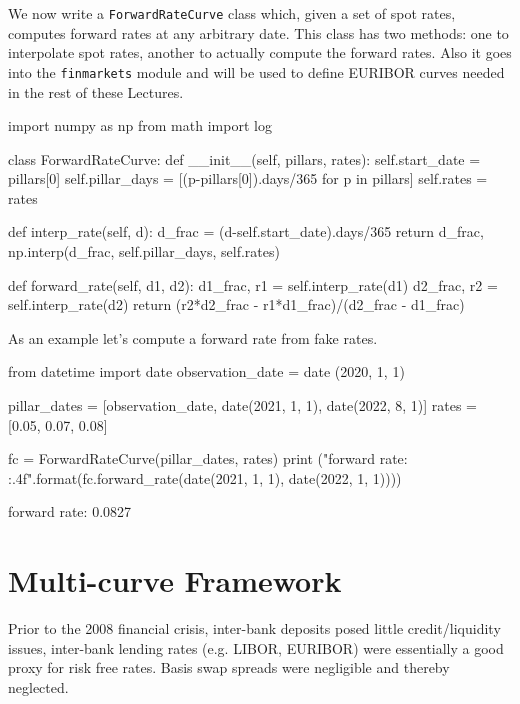 \begin{finmarkets}
We now write a \texttt{ForwardRateCurve} class which, given a set of spot rates, computes forward rates at any arbitrary date. This class has two methods: one to interpolate spot rates, another to actually compute the forward rates. Also it goes into the \texttt{finmarkets} module and will be used to define EURIBOR curves needed in the rest of these Lectures.
\end{finmarkets}

\begin{ipython}
import numpy as np
from math import log

class ForwardRateCurve:
    def __init__(self, pillars, rates):
        self.start_date = pillars[0]
        self.pillar_days = [(p-pillars[0]).days/365 for p in pillars]
        self.rates = rates

    def interp_rate(self, d):
        d_frac = (d-self.start_date).days/365
        return d_frac, np.interp(d_frac, self.pillar_days, self.rates)

    def forward_rate(self, d1, d2):
        d1_frac, r1 = self.interp_rate(d1)
        d2_frac, r2 = self.interp_rate(d2)
        return (r2*d2_frac - r1*d1_frac)/(d2_frac - d1_frac)
\end{ipython}

As an example let's compute a forward rate from fake rates.
\begin{ipython}
from datetime import date
observation_date = date (2020, 1, 1)

pillar_dates = [observation_date, 
                date(2021, 1, 1), 
                date(2022, 8, 1)]
rates = [0.05, 0.07, 0.08]

fc = ForwardRateCurve(pillar_dates, rates)
print ("forward rate: {:.4f}".format(fc.forward_rate(date(2021, 1, 1), 
                                                     date(2022, 1, 1))))
\end{ipython}
\begin{solution}
forward rate: 0.0827
\end{solution}

\section{Multi-curve Framework}
\label{sec:financial-crisis}

Prior to the 2008 financial crisis, inter-bank deposits posed little credit/liquidity issues, inter-bank lending rates (e.g. LIBOR, EURIBOR) were essentially a good proxy for risk free rates. Basis swap spreads were negligible and thereby neglected. 

